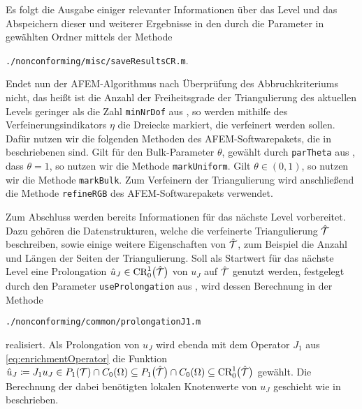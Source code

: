 Es folgt die Ausgabe einiger relevanter Informationen über das Level und das
Abspeichern dieser und weiterer Ergebnisse in den durch die Parameter in
 gewählten Ordner mittels der Methode
\begin{center}
  \texttt{./nonconforming/misc/saveResultsCR.m}.
\end{center}
Endet nun der AFEM-Algorithmus nach Überprüfung des Abbruchkriteriums nicht,
das heißt ist die Anzahl der Freiheitsgrade der Triangulierung des aktuellen
Levels geringer als die Zahl \texttt{minNrDof} aus , so
werden mithilfe des Verfeinerungsindikators $\eta$ die Dreiecke markiert, die
verfeinert werden sollen. 
Dafür nutzen wir die folgenden Methoden des AFEM-Softwarepakets, die in
\cite[Abschnitt 1.6]{CGKNRR10} beschriebenen sind.
Gilt für den Bulk-Parameter $\theta$, gewählt durch \texttt{parTheta} aus
, dass $\theta=1$, so nutzen
wir die Methode \texttt{markUniform}. Gilt $\theta\in(0,1)$, so nutzen wir
die Methode \texttt{markBulk}.
Zum Verfeinern der Triangulierung wird anschließend die Methode
\texttt{refineRGB} \cite[1.7.2]{CGKNRR10} des AFEM-Softwarepakets verwendet.

Zum Abschluss werden bereits Informationen für das nächste Level vorbereitet. 
Dazu gehören die Datenstrukturen, welche die verfeinerte Triangulierung
$\hat{\mathcal{T}}$ beschreiben, sowie einige weitere Eigenschaften von
$\hat{\mathcal{T}}$, zum Beispiel die Anzahl und Längen der Seiten der Triangulierung.
Soll als Startwert für das nächste Level eine Prolongation $\hat
u_J\in\textup{CR}^1_0\big(\hat{\mathcal{T}}\big)$ von $u_J$ auf $\hat{\mathcal{T}}$ genutzt werden,
festgelegt durch den Parameter \texttt{useProlongation} aus
, wird dessen Berechnung in der Methode
\begin{center}
  \texttt{./nonconforming/common/prolongationJ1.m}
\end{center}
realisiert. 
Als Prolongation von $u_J$ wird ebenda mit dem Operator $J_1$ aus
\eqref{eq:enrichmentOperator} die Funktion $\hat u_J\coloneqq J_1 u_J\in
P_1(\mathcal{T})\cap C_0(\Omega)\subseteq P_1\big(\hat{\mathcal{T}}\big)\cap C_0(\Omega)
\subseteq \textup{CR}^1_0\big(\hat{\mathcal{T}}\big)$ gewählt.
Die Berechnung der dabei benötigten lokalen Knotenwerte von $u_J$ geschieht
wie in  beschrieben.

